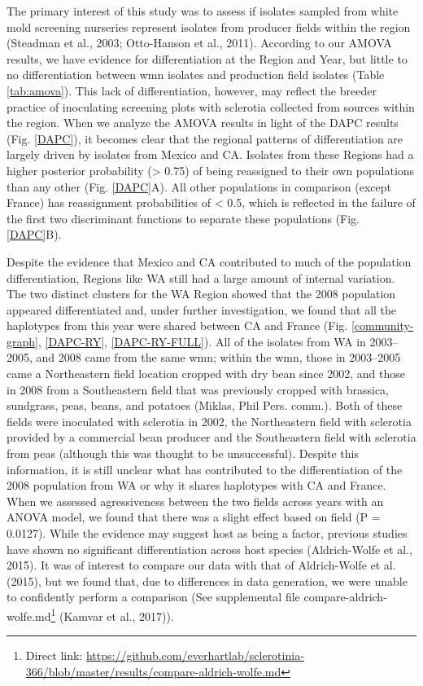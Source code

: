 The primary interest of this study was to assess if isolates sampled
from white mold screening nurseries represent isolates from producer
fields within the region (Steadman et al., 2003; Otto-Hanson et al.,
2011). According to our AMOVA results, we have evidence for
differentiation at the Region and Year, but little to no differentiation
between wmn isolates and production field isolates (Table
\ref{tab:amova}). This lack of differentiation, however, may reflect the
breeder practice of inoculating screening plots with sclerotia collected
from sources within the region. When we analyze the AMOVA results in
light of the DAPC results (Fig. \ref{DAPC}), it becomes clear that the
regional patterns of differentiation are largely driven by isolates from
Mexico and CA. Isolates from these Regions had a higher posterior
probability (\textgreater{} 0.75) of being reassigned to their own
populations than any other (Fig. \ref{DAPC}A). All other populations in
comparison (except France) has reassignment probabilities of \textless{}
0.5, which is reflected in the failure of the first two discriminant
functions to separate these populations (Fig. \ref{DAPC}B).

Despite the evidence that Mexico and CA contributed to much of the
population differentiation, Regions like WA still had a large amount of
internal variation. The two distinct clusters for the WA Region showed
that the 2008 population appeared differentiated and, under further
investigation, we found that all the haplotypes from this year were
shared between CA and France (Fig. \ref{community-graph}, \ref{DAPC-RY},
\ref{DAPC-RY-FULL}). All of the isolates from WA in 2003--2005, and 2008
came from the same wmn; within the wmn, those in 2003--2005 came a
Northeastern field location cropped with dry bean since 2002, and those
in 2008 from a Southeastern field that was previously cropped with
brassica, sundgrass, peas, beans, and potatoes (Miklas, Phil Pers.
comm.). Both of these fields were inoculated with sclerotia in 2002, the
Northeastern field with sclerotia provided by a commercial bean producer
and the Southeastern field with sclerotia from peas (although this was
thought to be unsuccessful). Despite this information, it is still
unclear what has contributed to the differentiation of the 2008
population from WA or why it shares haplotypes with CA and France. When
we assessed agressiveness between the two fields across years with an
ANOVA model, we found that there was a slight effect based on field (P =
0.0127). While the evidence may suggest host as being a factor, previous
studies have shown no significant differentiation across host species
(Aldrich-Wolfe et al., 2015). It was of interest to compare our data
with that of Aldrich-Wolfe et al. (2015), but we found that, due to
differences in data generation, we were unable to confidently perform a
comparison (See supplemental file compare-aldrich-wolfe.md\footnote{Direct
  link:
  \url{https://github.com/everhartlab/sclerotinia-366/blob/master/results/compare-aldrich-wolfe.md}}
(Kamvar et al., 2017)).

